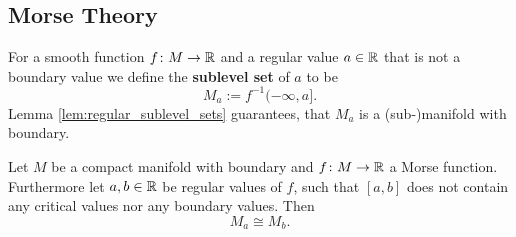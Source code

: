 \subsection{Morse Theory}

    
    For a smooth function $f \colon M \to \mathbb{R}$ and a regular value $a \in \mathbb{R}$ that is not a boundary value we define the \textbf{sublevel set} of $a$ to be
    \[
    M_a := f^{-1}(-\infty,a].
    \] 
    Lemma \ref{lem:regular_sublevel_sets} guarantees, that $M_a$ is a (sub-)manifold with boundary.

    \begin{lemma}
        \label{lem:topology_sublevel_sets_not_crossing_critical_point}
        Let $M$ be a compact manifold with boundary and $f \colon M \to \mathbb{R}$ a Morse function. Furthermore let $a,b \in \mathbb{R}$ be regular values of $f$, such that $[a,b]$ does not contain any critical values nor any boundary values. Then 
        \[
        M_a \cong M_b.
        \]
    \end{lemma}

